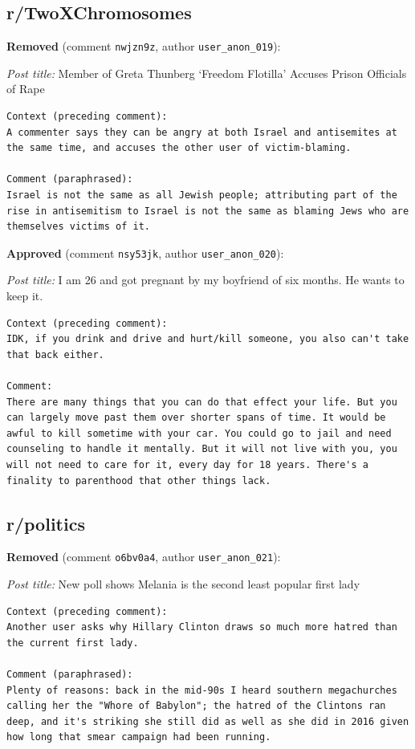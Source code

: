 \subsection*{r/TwoXChromosomes}

\noindent\textbf{Removed} (comment \texttt{nwjzn9z}, author \texttt{user\_anon\_019}):

\noindent\emph{Post title:} Member of Greta Thunberg ‘Freedom Flotilla’ Accuses Prison Officials of Rape

\begin{lstlisting}
Context (preceding comment):
A commenter says they can be angry at both Israel and antisemites at the same time, and accuses the other user of victim-blaming.

Comment (paraphrased):
Israel is not the same as all Jewish people; attributing part of the rise in antisemitism to Israel is not the same as blaming Jews who are themselves victims of it.
\end{lstlisting}

\noindent\textbf{Approved} (comment \texttt{nsy53jk}, author \texttt{user\_anon\_020}):

\noindent\emph{Post title:} I am 26 and got pregnant by my boyfriend of six months. He wants to keep it.

\begin{lstlisting}
Context (preceding comment):
IDK, if you drink and drive and hurt/kill someone, you also can't take that back either.

Comment:
There are many things that you can do that effect your life. But you can largely move past them over shorter spans of time. It would be awful to kill sometime with your car. You could go to jail and need counseling to handle it mentally. But it will not live with you, you will not need to care for it, every day for 18 years. There's a finality to parenthood that other things lack.
\end{lstlisting}


\subsection*{r/politics}

\noindent\textbf{Removed} (comment \texttt{o6bv0a4}, author \texttt{user\_anon\_021}):

\noindent\emph{Post title:} New poll shows Melania is the second least popular first lady

\begin{lstlisting}
Context (preceding comment):
Another user asks why Hillary Clinton draws so much more hatred than the current first lady.

Comment (paraphrased):
Plenty of reasons: back in the mid-90s I heard southern megachurches calling her the "Whore of Babylon"; the hatred of the Clintons ran deep, and it's striking she still did as well as she did in 2016 given how long that smear campaign had been running.
\end{lstlisting}

